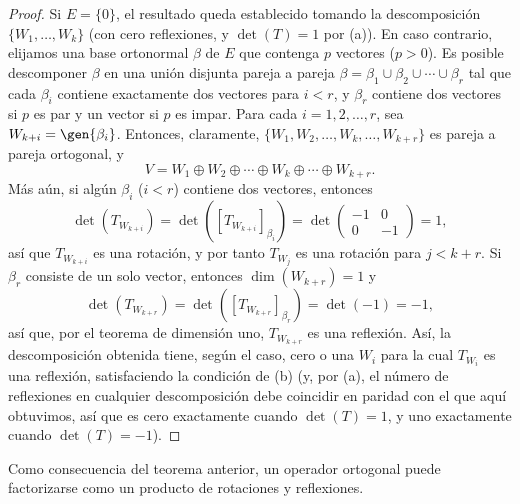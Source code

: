 \begin{proof}
    Si $E=\{0\}$, el resultado queda establecido tomando la descomposición $\{W_1,\dots,W_k\}$ (con cero reflexiones, y $\det(T)=1$ por (a)). En caso contrario, elijamos una base ortonormal $\beta$ de $E$ que contenga $p$ vectores ($p>0$). Es posible descomponer $\beta$ en una unión disjunta pareja a pareja $\beta=\beta_1\cup\beta_2\cup\cdots\cup\beta_r$ tal que cada $\beta_i$ contiene exactamente dos vectores para $i<r$, y $\beta_r$ contiene dos vectores si $p$ es par y un vector si $p$ es impar. Para cada $i=1,2,\dots,r$, sea $W_{k+i}=\gen{\beta_i}$. Entonces, claramente, $\{W_1,W_2,\dots,W_k,\dots,W_{k+r}\}$ es pareja a pareja ortogonal, y
    \begin{equation*}
        V=W_1\oplus W_2\oplus\cdots\oplus W_k\oplus\cdots\oplus W_{k+r}.
    \end{equation*}
    Más aún, si algún $\beta_i$ ($i<r$) contiene dos vectores, entonces
    \begin{equation*}
        \det(T_{W_{k+i}})=\det([T_{W_{k+i}}]_{\beta_i})=\det\begin{pmatrix}-1&0\\0&-1\end{pmatrix}=1,
    \end{equation*}
    así que $T_{W_{k+i}}$ es una rotación, y por tanto $T_{W_j}$ es una rotación para $j<k+r$. Si $\beta_r$ consiste de un solo vector, entonces $\dim(W_{k+r})=1$ y
    \begin{equation*}
        \det(T_{W_{k+r}})=\det([T_{W_{k+r}}]_{\beta_r})=\det(-1)=-1,
    \end{equation*}
    así que, por el teorema de dimensión uno, $T_{W_{k+r}}$ es una reflexión. Así, la descomposición obtenida tiene, según el caso, cero o una $W_i$ para la cual $T_{W_i}$ es una reflexión, satisfaciendo la condición de (b) (y, por (a), el número de reflexiones en cualquier descomposición debe coincidir en paridad con el que aquí obtuvimos, así que es cero exactamente cuando $\det(T)=1$, y uno exactamente cuando $\det(T)=-1$).
\end{proof}

Como consecuencia del teorema anterior, un operador ortogonal puede factorizarse como un producto de rotaciones y reflexiones.

